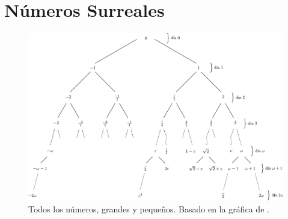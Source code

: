 \chapter{Números Surreales}
    \label{section:surreal}
    
    
    
    
    
    
    \begin{figure}
        \centering
        \includegraphics[width=\textwidth]{images/surreal-infinite.pdf}
        \caption{Todos los n\'umeros, grandes y peque\~nos. Basado en la gr\'afica de \cite{Conway2000}.}
        \label{figure:surreal-infinite}
    \end{figure}